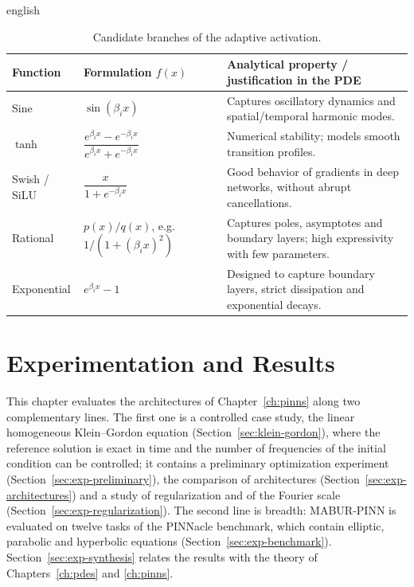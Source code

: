 \documentclass[11pt,letterpaper,twoside,openright]{book} %
\begin{document}
\begin{hyphenrules}{english}
\begin{table}[htbp]
  \centering
  \caption{Candidate branches of the adaptive activation.}
  \label{tab:abu-branches}
  \small
  \begin{tabularx}{\linewidth}{@{}llX@{}}
    \toprule
    Function & Formulation $f(x)$ & Analytical property / justification in the PDE \\
    \midrule
    Sine & $\sin(\beta_ix)$ & Captures oscillatory dynamics and spatial/temporal harmonic modes. \\
    $\tanh$ & $\dfrac{e^{\beta_ix}-e^{-\beta_ix}}{e^{\beta_ix}+e^{-\beta_ix}}$ & Numerical stability; models smooth transition profiles. \\
    Swish / SiLU & $\dfrac{x}{1+e^{-\beta_ix}}$ & Good behavior of gradients in deep networks, without abrupt cancellations. \\
    Rational & $p(x)/q(x)$, e.g.\ $1/(1+(\beta_ix)^2)$ & Captures poles, asymptotes and boundary layers; high expressivity with few parameters. \\
    Exponential & $e^{\beta_ix}-1$ & Designed to capture boundary layers, strict dissipation and exponential decays. \\
    \bottomrule
  \end{tabularx}
\end{table}


\chapter{Experimentation and Results}\label{ch:experiments}

This chapter evaluates the architectures of Chapter~\ref{ch:pinns} along two complementary lines. The first
one is a controlled case study, the linear homogeneous Klein--Gordon equation (Section~\ref{sec:klein-gordon}),
where the reference solution is exact in time and the number of frequencies of the initial condition can
be controlled; it contains a preliminary optimization experiment (Section~\ref{sec:exp-preliminary}), the
comparison of architectures (Section~\ref{sec:exp-architectures}) and a study of regularization and of the
Fourier scale (Section~\ref{sec:exp-regularization}). The second line is breadth: MABUR-PINN is evaluated on
twelve tasks of the PINNacle benchmark, which contain elliptic, parabolic and hyperbolic equations
(Section~\ref{sec:exp-benchmark}). Section~\ref{sec:exp-synthesis} relates the results with the theory of
Chapters~\ref{ch:pdes} and \ref{ch:pinns}.


\end{hyphenrules}
\end{document}
